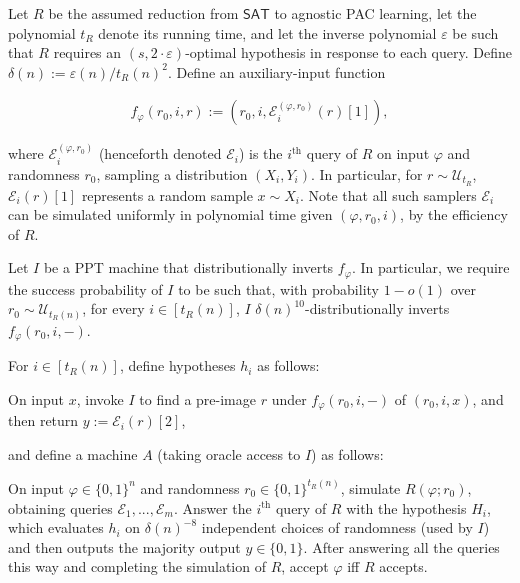 \documentclass[10pt,a4paper]{article}
\begin{document}
Let $R$ be the assumed reduction from ${\mathsf{SAT}}$ to agnostic PAC learning, let the polynomial $t_{R}$ denote its running time, and let the inverse polynomial $\varepsilon$ be such that $R$ requires an $(s,2\cdot\varepsilon)$-optimal hypothesis in response to each query. Define $\delta(n):=\varepsilon(n)/t_{R}(n)^{2}$. Define an auxiliary-input function\par


\[\begin{gathered}
f_{\varphi}(r_{0},i,r):=(r_{0},i,\mathcal{E}_{i}^{(\varphi,r_{0})}(r)[1]),
\end{gathered}\]


where $\mathcal{E}_{i}^{(\varphi,r_{0})}$ (henceforth denoted $\mathcal{E}_{i}$) is the $i^{\text{th}}$ query of $R$ on input $\varphi$ and randomness $r_{0}$, sampling a distribution $(X_{i},Y_{i})$. In particular, for $r\sim\mathcal{U}_{t_{R}}$, $\mathcal{E}_{i}(r)[1]$ represents a random sample $x\sim X_{i}$. Note that all such samplers $\mathcal{E}_{i}$ can be simulated uniformly in polynomial time given $(\varphi,r_{0},i)$, by the efficiency of $R$.\par




Let $I$ be a PPT machine that distributionally inverts $f_{\varphi}$. In particular, we require the success probability of $I$ to be such that, with probability $1-o(1)$ over $r_{0}\sim\mathcal{U}_{t_{R}(n)}$, for every $i\in[t_{R}(n)]$, $I$ $\delta(n)^{10}$-distributionally inverts $f_{\varphi}(r_{0},i,-)$.\par




For $i\in[t_{R}(n)]$, define hypotheses $h_{i}$ as follows:\par



On input $x$, invoke $I$ to find a pre-image $r$ under $f_{\varphi}(r_{0},i,-)$ of $(r_{0},i,x)$, and then return $y:=\mathcal{E}_{i}(r)[2]$,\par



and define a machine $A$ (taking oracle access to $I$) as follows:\par



On input $\varphi\in\{0,1\}^{n}$ and randomness $r_{0}\in\{0,1\}^{t_{R}(n)}$, simulate $R(\varphi;r_{0})$, obtaining queries $\mathcal{E}_{1},...,\mathcal{E}_{m}$. Answer the $i^{\text{th}}$ query of $R$ with the hypothesis $H_{i}$, which evaluates $h_{i}$ on $\delta(n)^{-8}$ independent choices of randomness (used by $I$) and then outputs the majority output $y\in\{0,1\}$. After answering all the queries this way and completing the simulation of $R$, accept $\varphi$ iff $R$ accepts.\par
\end{document}
